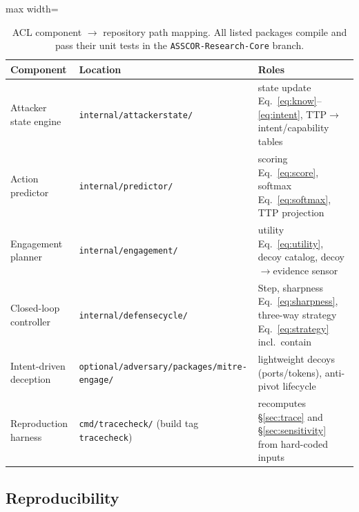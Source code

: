 \documentclass[11pt]{article}
\begin{document}
\begin{table}[ht]
\centering
\begin{adjustbox}{max width=\linewidth}\begin{tabular}{@{}lll@{}}
\toprule
\textbf{Component} & \textbf{Location} & \textbf{Roles} \\
\midrule
Attacker state engine & \texttt{internal/attackerstate/} & state update
Eq.~\ref{eq:know}--\ref{eq:intent}, TTP$\to$intent/capability tables \\
Action predictor & \texttt{internal/predictor/} & scoring
Eq.~\ref{eq:score}, softmax Eq.~\ref{eq:softmax}, TTP projection \\
Engagement planner & \texttt{internal/engagement/} & utility
Eq.~\ref{eq:utility}, decoy catalog, decoy$\to$evidence sensor \\
Closed-loop controller & \texttt{internal/defensecycle/} & Step,
sharpness Eq.~\ref{eq:sharpness}, three-way strategy
Eq.~\ref{eq:strategy} incl.\ contain \\
Intent-driven deception & \texttt{optional/adversary/packages/mitre-engage/} &
lightweight decoys (ports/tokens), anti-pivot lifecycle \\
Reproduction harness & \texttt{cmd/tracecheck/} (build tag
\texttt{tracecheck}) & recomputes \S\ref{sec:trace} and
\S\ref{sec:sensitivity} from hard-coded inputs \\
\bottomrule
\end{tabular}\end{adjustbox}
\caption{ACL component $\to$ repository path mapping. All listed packages
compile and pass their unit tests in the \texttt{ASSCOR-Research-Core}
branch.}
\label{tab:repo-map}
\end{table}

\subsection{Reproducibility}
\end{document}
